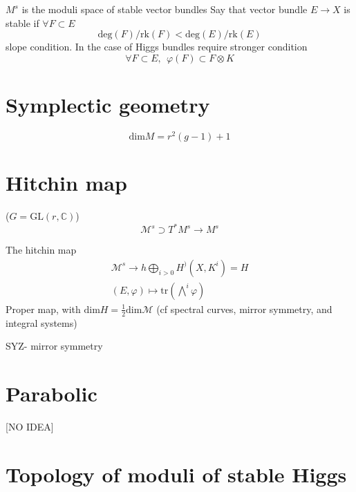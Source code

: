 $M^s$ is the moduli space of stable vector bundles 
Say that vector bundle $E \rightarrow  X$ is stable if
$\forall F \subset E $ 
\begin{equation}
    \mathrm{deg} (F) / \mathrm{rk} (F) < \mathrm{deg}(E) / \mathrm{rk}(E) 
\end{equation}
slope condition. 
In the case of Higgs bundles require stronger condition
\begin{equation}
     \forall F \subset E, ~~ \varphi(F) \subset F \otimes K 
\end{equation}


\section{Symplectic geometry} %

\begin{equation}
    \mathrm{dim} M = r^2 ( g-1 ) + 1
\end{equation}

\section{Hitchin map} %
($ G = \mathrm{GL} ( r, \mathbb{C} ) $) 
\begin{equation}
    \mathcal{M}^s \supset T^* M^s \rightarrow M ^s
\end{equation}

The hitchin map 
\begin{align}
    \mathcal{M}^s \rightarrow{h} \bigoplus _{i>0 } H^) ( X, K^i )  = H \\
    (E, \varphi ) \mapsto \mathrm{tr} ( \bigwedge ^i \varphi ) 
\end{align}
Proper map, with $ \mathrm{dim} H  = \frac{1}{2} \mathrm{dim} \mathcal{M} $
(cf spectral curves, mirror symmetry, and integral systems) 

SYZ- mirror symmetry 

\section{Parabolic} %

[NO IDEA]


\section{Topology of moduli of stable Higgs} %

